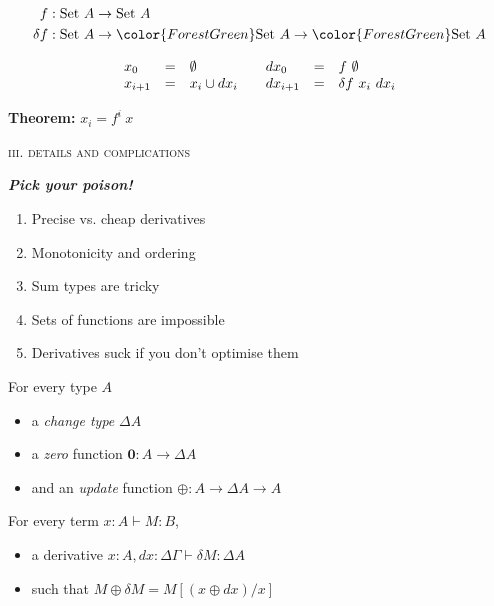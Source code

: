 \documentclass[dvipsnames]{beamer}
\newcommand\G\Gamma
\newcommand\D\Delta
\newcommand{\mb}{\mathbf}
\newcommand\tpname[1]{\mathrm{#1}}
\newcommand\tset{\tpname{Set}~}
\newcommand\zero{\mb{0}}
\newcommand{\changecolor}{\color{ForestGreen}}
\begin{document}
\begin{frame}
  \Large
  \begin{align*}
    f &: \tset{A} \to \tset{A}\\
    \delta f &: \tset{A} \to {\changecolor\tset{A}} \to {\changecolor\tset{A}}
  \end{align*}

  \pause
  \vspace{.5em}
  \[\begin{array}{lcl@{\hspace{2em}}lcl}
    x_0 &=& \emptyset
    & dx_0 &=& f ~\emptyset\\
    x_{i+1} &=& x_i \cup dx_i
    & dx_{i+1} &=& \delta f ~x_i ~dx_i\\
  \end{array}\]

  \vspace{1em}
  \textbf{Theorem:} $x_i = f^i~x$
\end{frame}


\begin{frame}
  \centering\huge{\scshape iii. details and complications}

  \Large
  \textbf{\itshape Pick your poison!}
  \begin{enumerate}
  \item Precise vs. cheap derivatives
  \item Monotonicity and ordering
  \item Sum types are tricky
  \item Sets of functions are impossible
  \item Derivatives suck if you don't optimise them
  \end{enumerate}
\end{frame}

\begin{frame}\Large
  For every type $A$
  \begin{itemize}
  \item a \emph{change type} $\D A$
  \item a \emph{zero} function $\zero : A \to \D A$
  \item and an \emph{update} function $\oplus : A \to \D A \to A$
  \end{itemize}
  \vspace{1.5em}

  For every term $x : A \vdash M : B$,
  \begin{itemize}
  \item a derivative $x : A, dx : \D\G \vdash \delta M : \D A$
  \item such that $M \oplus \delta M = M[(x\oplus dx)/x]$
  \end{itemize}
\end{frame}
\end{document}
